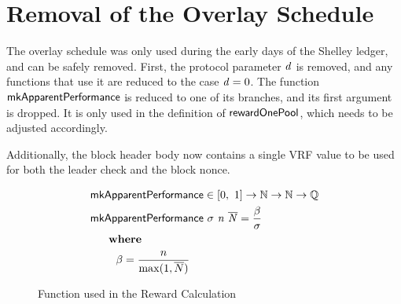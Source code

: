\newcommand{\createRUpd}[4]{\fun{createRUpd}~\var{#1}~\var{#2}~\var{#3}~\var{#4}}
\newcommand{\mkApparentPerformance}[3]{\fun{mkApparentPerformance}~{#1}~\var{#2}~\var{#3}}
\newcommand{\Q}{\ensuremath{\mathbb{Q}}}
\newcommand{\ActiveSlotCoeff}{\mathsf{ActiveSlotCoeff}}
\newcommand{\EpochState}{\type{EpochState}}
\newcommand{\BlocksMade}{\type{BlocksMade}}
\newcommand{\RewardUpdate}{\type{RewardUpdate}}
\newcommand{\PrtclState}{\type{PrtclState}}
\newcommand{\PrtclEnv}{\type{PrtclEnv}}
\newcommand{\PoolDistr}{\type{PoolDistr}}
\newcommand{\BHBody}{\type{BHBody}}
\newcommand{\HashHeader}{\type{HashHeader}}
\newcommand{\HashBBody}{\type{HashBBody}}
\newcommand{\BlockNo}{\type{BlockNo}}
\newcommand{\Proof}{\type{Proof}}
\newcommand{\OCert}{\type{OCert}}
\newcommand{\bheader}[1]{\fun{bheader}~\var{#1}}
\newcommand{\verifyVrf}[4]{\fun{verifyVrf}_{#1} ~ #2 ~ #3 ~#4}
\newcommand{\slotToSeed}[1]{\fun{slotToSeed}~ \var{#1}}
\newcommand{\XOR}{\mathsf{XOR}}

\section{Removal of the Overlay Schedule}

The overlay schedule was only used during the early days of the Shelley ledger, and can be safely removed. First, the protocol parameter $\mathit{d}$ is removed, and any functions that use it are reduced to the case $\mathit{d} = 0$. The function $\mathsf{mkApparentPerformance}$ is reduced to one of its branches, and its first argument is dropped. It is only used in the definition of $\mathsf{rewardOnePool}$, which needs to be adjusted accordingly.

Additionally, the block header body now contains a single VRF value to be used for both the leader check and the block nonce.

\begin{figure}[htb]
    \begin{align*}
      & \fun{mkApparentPerformance} \in \unitInterval \to \N \to \N \to \Q \\
      & \mkApparentPerformance{\sigma}{n}{\overline{N}} = \frac{\beta}{\sigma} \\
      & ~~~\where \\
      & ~~~~~~~\beta = \frac{n}{\max(1, \overline{N})} \\
  \end{align*}
  \caption{Function used in the Reward Calculation}
  \label{fig:functions:rewards}
\end{figure}

